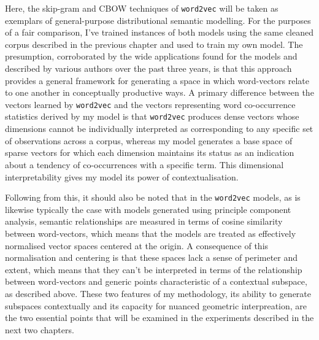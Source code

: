 Here, the skip-gram and CBOW techniques of \texttt{word2vec} will be taken as exemplars of general-purpose distributional semantic modelling.  For the purposes of a fair comparison, I've trained instances of both models using the same cleaned corpus described in the previous chapter and used to train my own model.  The presumption, corroborated by the wide applications found for the models and described by various authors over the past three years, is that this approach provides a general framework for generating a space in which word-vectors relate to one another in conceptually productive ways.  A primary difference between the vectors learned by \texttt{word2vec} and the vectors representing word co-occurrence statistics derived by my model is that \texttt{word2vec} produces dense vectors whose dimensions cannot be individually interpreted as corresponding to any specific set of observations across a corpus, whereas my model generates a base space of sparse vectors for which each dimension maintains its status as an indication about a tendency of co-occurrences with a specific term.  This dimensional interpretability gives my model its power of contextualisation.

Following from this, it should also be noted that in the \texttt{word2vec} models, as is likewise typically the case with models generated using principle component analysis, semantic relationships are measured in terms of cosine similarity between word-vectors, which means that the models are treated as effectively normalised vector spaces centered at the origin.  A consequence of this normalisation and centering is that these spaces lack a sense of perimeter and extent, which means that they can't be interpreted in terms of the relationship between word-vectors and generic points characteristic of a contextual subspace, as described above.  These two features of my methodology, its ability to generate subspaces contextually and its capacity for nuanced geometric interpreation, are the two essential points that will be examined in the experiments described in the next two chapters.

